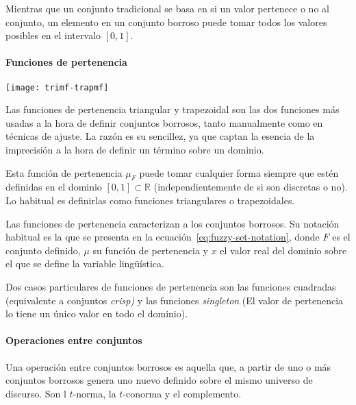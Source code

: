 Mientras que un conjunto tradicional se basa en si un valor pertenece o no al conjunto, un elemento en un conjunto borroso puede tomar todos los valores posibles en el intervalo $[0, 1]$.

\paragraph{Funciones de pertenencia}

\begin{marginfigure}
	\centering
	\texttt{[image: trimf-trapmf]}
	\caption[Gráfica de funciones de pertenencia triangular y trapezoidal]{Las funciones de pertenencia triangular y trapezoidal son las dos funciones más usadas a la hora de definir conjuntos borrosos, tanto manualmente como en técnicas de ajuste. La razón es su sencillez, ya que captan la esencia de la imprecisión a la hora de definir un término sobre un dominio.}
	\label{fig:trimf-trapmf}
\end{marginfigure}

Esta función de pertenencia $\mu_F$ puede tomar cualquier forma siempre que estén definidas en el dominio $[0, 1] \subset \mathbb{R}$ (independientemente de si son discretas o no). Lo habitual es definirlas como funciones triangulares o trapezoidales.

Las funciones de pertenencia caracterizan a los conjuntos borrosos. Su notación habitual es la que se presenta en la ecuación~\ref{eq:fuzzy-set-notation}, donde $F$ es el conjunto definido, $\mu$ su función de pertenencia y $x$ el valor real del dominio sobre el que se define la variable lingüística.

Dos casos particulares de funciones de pertenencia son las funciones cuadradas (equivalente a conjuntos \textit{crisp)} y las funciones \textit{singleton} (El valor de pertenencia lo tiene un único valor en todo el dominio).

\paragraph{Operaciones entre conjuntos}

Una operación entre conjuntos borrosos es aquella que, a partir de uno o más conjuntos borrosos genera uno nuevo definido sobre el mismo universo de discurso. Son l $t$-norma, la $t$-conorma y el complemento.

